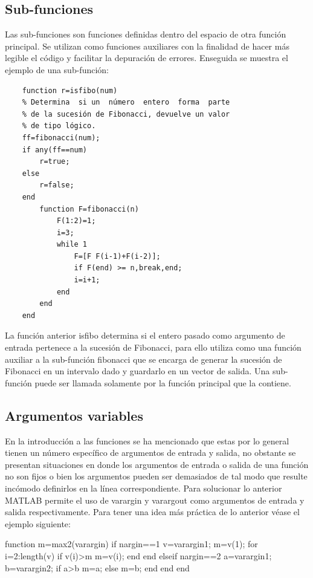 \subsection{Sub-funciones}

Las sub-funciones son funciones definidas dentro del espacio de otra función principal. 
Se utilizan como funciones auxiliares con la finalidad de hacer más legible el código y 
facilitar la depuración de errores. Enseguida se muestra el ejemplo de una sub-función:

\begin{verbatim}
	function r=isfibo(num)
	% Determina  si un  número  entero  forma  parte
	% de la sucesión de Fibonacci, devuelve un valor
	% de tipo lógico.
	ff=fibonacci(num);
	if any(ff==num)
	    r=true;
	else
	    r=false;
	end
	    function F=fibonacci(n)
	        F(1:2)=1;
	        i=3;
	        while 1
	            F=[F F(i-1)+F(i-2)];
	            if F(end) >= n,break,end;
	            i=i+1;
	        end
	    end
	end
\end{verbatim}

La función anterior isfibo determina si el entero pasado como argumento de entrada 
pertenece a la sucesión de Fibonacci, para ello utiliza como una función auxiliar a 
la sub-función fibonacci que se encarga de generar la sucesión de Fibonacci en un 
intervalo dado y guardarlo en un vector de salida. Una sub-función puede ser llamada 
solamente por la función principal que la contiene.

\subsection{Argumentos variables}

En la introducción a las funciones se ha mencionado que estas por lo general 
tienen un número específico de argumentos de entrada y salida, no obstante se 
presentan situaciones en donde  los argumentos de entrada o salida de una función 
no son fijos o bien los argumentos pueden ser demasiados de tal modo que resulte 
incómodo definirlos en la línea correspondiente. Para solucionar lo anterior MATLAB 
permite el uso de varargin y varargout como argumentos de entrada y salida 
respectivamente. Para tener una  idea más práctica de lo anterior véase el ejemplo siguiente:

\begin{matlab}
	function m=max2(varargin)
	if nargin==1
	    v=varargin{1};
	    m=v(1);
	    for i=2:length(v)
	        if v(i)>m
	            m=v(i);
	        end
	    end 
	elseif nargin==2
	    a=varargin{1};
	    b=varargin{2};
	    if a>b
	        m=a;
	    else
	        m=b;
	    end
	end
	end
\end{matlab}

